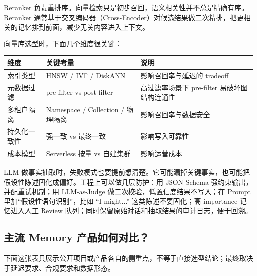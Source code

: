 \documentclass[9pt,a4paper,twocolumn]{ctexart}
\begin{document}
Reranker 负责重排序。向量检索只是初步召回，语义相关性并不总是精确有序。Reranker 通常基于交叉编码器（Cross-Encoder）对候选结果做二次精排，把更相关的记忆排到前面，减少无关内容进入上下文。



向量库选型时，下面几个维度很关键：


{\footnotesize
\begin{tabular}{|p{}|p{}|p{}|}
\hline
\textbf{维度} & \textbf{关键考量} & \textbf{说明} \\
\hline
索引类型 & HNSW / IVF / DiskANN & 影响召回率与延迟的 tradeoff \\
\hline
元数据过滤 & pre-filter vs post-filter & 高过滤率场景下 pre-filter 易破坏图结构连通性 \\
\hline
多租户隔离 & Namespace / Collection / 物理隔离 & 影响召回率与数据安全 \\
\hline
持久化一致性 & 强一致 vs 最终一致 & 影响写入可靠性 \\
\hline
成本模型 & Serverless 按量 vs 自建集群 & 影响运营成本 \\
\hline
\end{tabular}
}



LLM 做事实抽取时，失败模式也要提前想清楚。它可能漏掉关键事实，也可能把假设性陈述固化成偏好。工程上可以做几层防护：用 JSON Schema 强约束输出，并配重试机制；用 LLM-as-Judge 做二次校验，低置信度结果不写入；在 Prompt 里加“假设性语句识别”，比如 “I might...” 这类陈述不要固化；高 importance 记忆进入人工 Review 队列；同时保留原始对话和抽取结果的审计日志，便于回溯。



\subsection*{主流 Memory 产品如何对比？}


下面这张表只展示公开项目或产品各自的侧重点，不等于直接选型结论；最终取决于延迟要求、合规要求和数据形态。
\end{document}
